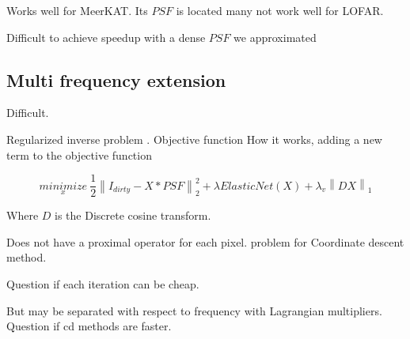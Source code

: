 Works well for MeerKAT. Its $PSF$ is located many not work well for LOFAR.

Difficult to achieve speedup with a dense $PSF$ we approximated












\subsection{Multi frequency extension}\label{discussion:mfs}
Difficult.

Regularized inverse problem  \cite{ferrari2015multi}. Objective function 
How it works, adding a new term to the objective function

\begin{equation}\label{cd:deconv}
\underset{x}{minimize} \: \frac{1}{2} \left \| I_{dirty} - X * PSF \right \|_2^2 + \lambda ElasticNet(X) + \lambda_v \left \| DX \right \|_1
\end{equation}

Where $D$ is the Discrete cosine transform.

Does not have a proximal operator for each pixel. problem for Coordinate descent method.

Question if each iteration can be cheap.

But may be separated with respect to frequency with Lagrangian multipliers. Question if cd methods are faster.
